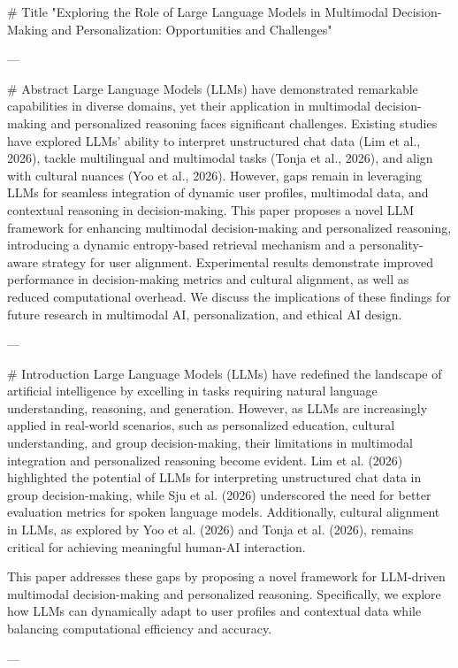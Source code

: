 # Title  
"Exploring the Role of Large Language Models in Multimodal Decision-Making and Personalization: Opportunities and Challenges"

---

# Abstract  
Large Language Models (LLMs) have demonstrated remarkable capabilities in diverse domains, yet their application in multimodal decision-making and personalized reasoning faces significant challenges. Existing studies have explored LLMs' ability to interpret unstructured chat data (Lim et al., 2026), tackle multilingual and multimodal tasks (Tonja et al., 2026), and align with cultural nuances (Yoo et al., 2026). However, gaps remain in leveraging LLMs for seamless integration of dynamic user profiles, multimodal data, and contextual reasoning in decision-making. This paper proposes a novel LLM framework for enhancing multimodal decision-making and personalized reasoning, introducing a dynamic entropy-based retrieval mechanism and a personality-aware strategy for user alignment. Experimental results demonstrate improved performance in decision-making metrics and cultural alignment, as well as reduced computational overhead. We discuss the implications of these findings for future research in multimodal AI, personalization, and ethical AI design.  

---

# Introduction  
Large Language Models (LLMs) have redefined the landscape of artificial intelligence by excelling in tasks requiring natural language understanding, reasoning, and generation. However, as LLMs are increasingly applied in real-world scenarios, such as personalized education, cultural understanding, and group decision-making, their limitations in multimodal integration and personalized reasoning become evident. Lim et al. (2026) highlighted the potential of LLMs for interpreting unstructured chat data in group decision-making, while Sju et al. (2026) underscored the need for better evaluation metrics for spoken language models. Additionally, cultural alignment in LLMs, as explored by Yoo et al. (2026) and Tonja et al. (2026), remains critical for achieving meaningful human-AI interaction.  

This paper addresses these gaps by proposing a novel framework for LLM-driven multimodal decision-making and personalized reasoning. Specifically, we explore how LLMs can dynamically adapt to user profiles and contextual data while balancing computational efficiency and accuracy.  

---

